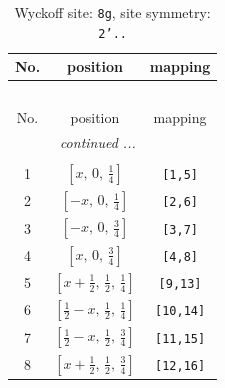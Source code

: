 \documentclass[fleqn,8pt]{jsarticle}
\begin{document}
\renewcommand{\arraystretch}{1.2}
\begin{longtable}{ccc}
\caption{Wyckoff site: {\tt 8g}, site symmetry: {\tt 2'..}}
 \\
 \hline \hline
No. & position & mapping \\ \hline \endfirsthead

\multicolumn{2}{l}{\tablename\ \thetable{}} \\
 \hline \hline
No. & position & mapping \\ \hline \endhead

 \hline \hline
\multicolumn{2}{r}{\footnotesize\it continued ...} \\ \endfoot

 \hline \hline
\multicolumn{2}{r}{} \\ \endlastfoot

1 & $\left[ x,\, 0,\, \frac{1}{4} \right]$ & {\tt [1,5]} \\ \hline
2 & $\left[ - x,\, 0,\, \frac{1}{4} \right]$ & {\tt [2,6]} \\ \hline
3 & $\left[ - x,\, 0,\, \frac{3}{4} \right]$ & {\tt [3,7]} \\ \hline
4 & $\left[ x,\, 0,\, \frac{3}{4} \right]$ & {\tt [4,8]} \\ \hline
5 & $\left[ x + \frac{1}{2},\, \frac{1}{2},\, \frac{1}{4} \right]$ & {\tt [9,13]} \\ \hline
6 & $\left[ \frac{1}{2} - x,\, \frac{1}{2},\, \frac{1}{4} \right]$ & {\tt [10,14]} \\ \hline
7 & $\left[ \frac{1}{2} - x,\, \frac{1}{2},\, \frac{3}{4} \right]$ & {\tt [11,15]} \\ \hline
8 & $\left[ x + \frac{1}{2},\, \frac{1}{2},\, \frac{3}{4} \right]$ & {\tt [12,16]} \\
\end{longtable}
\renewcommand{\arraystretch}{1.2}
\end{document}
